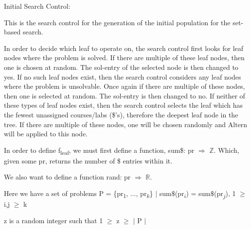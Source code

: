 \documentclass[11pt, oneside]{article}   	%
\newenvironment{cmr}{\fontfamily{cmr}\selectfont}{\par}
\begin{document}

\begin{cmr}
\noindent Initial Search Control:
\begin{comment}
\noindent Our O\textsubscript{Tree} will obviously begin with a single node, (pr, ?). Its expansion will be governed by the recursive relation, Erw\textsubscript{$\lor$}.
After each application of Altern, the search control will perform a constraint analysis on each new successor node of O\textsubscript{Tree} using \textbf{Constr\textsuperscript{*}}.
\end{comment}

\noindent This is the search control for the generation of the initial population for the set-based search.

\noindent In order to decide which leaf to operate on, the search control first looks for leaf nodes where the problem is solved. If there are multiple of these leaf nodes, then one is chosen at random. The sol-entry of the selected node is then changed to yes.
If no such leaf nodes exist, then the search control considers any leaf nodes where the problem is unsolvable. Once again if there are multiple of these nodes, then one is selected at random. The sol-entry is then changed to no. If neither of these types of leaf nodes exist, then the search control selects the leaf which has the fewest unassigned courses/labs (\$'s), therefore the deepest leaf node in the tree. 
If there are multiple of these nodes, one will be chosen randomly and Altern will be applied to this node.

\end{cmr}
\begin{comment}
\noindent The search control will pick a random leaf from among the minimal f\textsubscript{leaf} values.
\end{comment}

\noindent In order to define f\textsubscript{leaf}, we must first define a function, sum\$: pr $\Rightarrow$ $\mathbb{Z}$. Which, given some pr, returns the number of \$ entries within it. 

\noindent We also want to define a function rand: pr $\Rightarrow$ $\mathbb{R}$. 

\noindent Here we have a set of problems P =  \{pr\textsubscript{1}, $\dots$, pr\textsubscript{$k$}\} $\vert$ sum$\$$(pr\textsubscript{$i$}) = sum$\$$(pr\textsubscript{$j$}), 1 $\geq$ i,j $\geq$ k

\noindent z is a random integer such that 1 $\geq$ z $\geq$ $\vert$ P $\vert$
\end{document}
